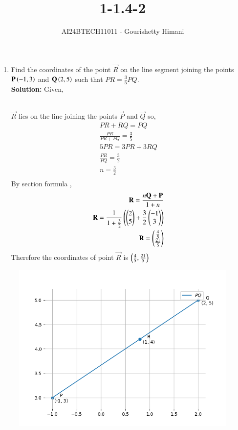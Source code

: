 \documentclass[journal,12pt,onecolumn]{IEEEtran}
\theoremstyle{remark}
\begin{document}

\vspace{3cm}

\title{1-1.4-2}
\author{AI24BTECH11011 - Gourishetty Himani}
\maketitle	
\bigskip

\renewcommand{\thefigure}{\theenumi}
\renewcommand{\thetable}{\theenumi}
\begin{enumerate}

\item Find the coordinates of the point $\vec{R}$ on the line segment joining the points $\mathbf{P}\left(-1,3\right)$ and $\mathbf{Q}\left(2,5\right)$ such that $PR=\frac{3}{5}PQ$.\\
\textbf{Solution:} Given,\\
\begin{table}[h!]    
  \centering
  
  \label{tab1-1.4-2}
\end{table}\\
 $\vec{R}$ lies on the line joining the points $\vec{P}$ and $\vec{Q}$ so,
\begin{align}
PR + RQ = PQ  \\
\frac{PR}{PR+PQ}=\frac{3}{5}\\ 
5PR=3PR+3RQ \\
\frac{PR}{PQ}=\frac{3}{2}\\
 n=\frac{3}{2}\\
\end{align}
By section formula ,\\ 
\begin{align}
\mathbf{R}=\frac{n\mathbf{Q}+\mathbf{P}}{1+n}\\
\mathbf{R}=\frac{1}{1+\frac{3}{2}}\left(\begin{pmatrix}2 \\ 5\end{pmatrix}+\frac{3}{2}\begin{pmatrix}-1 \\ 3\end{pmatrix}\right)\\
 \mathbf{R}=\begin{pmatrix}\frac{4}{5}\\\frac{21}{5}\end{pmatrix}\\
\end{align}
 Therefore the coordinates of point $\vec{R}$ is $\left(\frac{4}{5},\frac{21}{5}\right)$
\end{enumerate}
\begin{figure}[h!]
\centering
\includegraphics[width=0.7\linewidth]{figs/plot1.png}
\label{fig1}
\end{figure}
\end{document}
